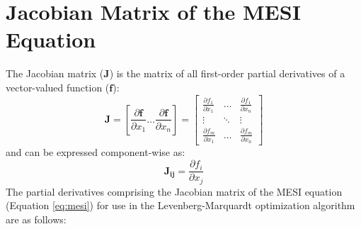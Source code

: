 
\chapter{Jacobian Matrix of the MESI Equation} \label{app:mesi_jacobian}

The Jacobian matrix ($\bm{J}$) is the matrix of all first-order partial derivatives of a vector-valued function ($\bm{f}$):
%
\begin{equation}
    \bm{J} = \left[\frac{\partial \bm{f}}{\partial x_1} \ldots \frac{\partial \bm{f}}{\partial x_n}\right]
    = \begin{bmatrix}
    \frac{\partial f_1}{\partial x_1} & \dots & \frac{\partial f_1}{\partial x_n} \\
    \vdots & \ddots & \vdots \\
    \frac{\partial f_m}{\partial x_1} & \dots & \frac{\partial f_m}{\partial x_n}
    \end{bmatrix}
\end{equation}
%
and can be expressed component-wise as:
%
\begin{equation}
    \bm{J_{ij}} = \frac{\partial f_i}{\partial x_j}
\end{equation}
%
The partial derivatives comprising the Jacobian matrix of the MESI equation (Equation \ref{eq:mesi}) for use in the Levenberg-Marquardt optimization algorithm are as follows:


